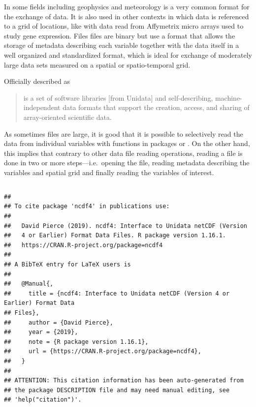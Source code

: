 \documentclass[krantz2]{krantz}\usepackage{knitr}%
\begin{document}
In some fields including geophysics and meteorology  is a very common format for the exchange of data. It is also used in other contexts in which data is referenced to a grid of locations, like with data read from Affymetrix micro arrays used to study gene expression. Files  files are binary but use a format that allows the storage of metadata describing each variable together with the data itself in a well organized and standardized format, which is ideal for exchange of moderately large data sets measured on a spatial or spatio-temporal grid.

Officially described as
\begin{quote}
 is a set of software libraries [from Unidata] and self-describing, machine-independent data formats that support the creation, access, and sharing of array-oriented scientific data.
\end{quote}

As sometimes  files are large, it is good that it is possible to selectively read the data from individual variables with functions in packages  or . On the other hand, this implies that contrary to other data file reading operations, reading a  file is done in two or more steps---i.e.\ opening the file, reading metadata describing the variables and spatial grid and finally reading the variables of interest.

\subsection[ncdf4]{}

\begin{knitrout}\footnotesize
{}\color{fgcolor}\begin{kframe}
\begin{alltt}
\hlstd{(} \hlstd{=} \hlstd{)}
\end{alltt}
\begin{verbatim}
## 
## To cite package 'ncdf4' in publications use:
## 
##   David Pierce (2019). ncdf4: Interface to Unidata netCDF (Version
##   4 or Earlier) Format Data Files. R package version 1.16.1.
##   https://CRAN.R-project.org/package=ncdf4
## 
## A BibTeX entry for LaTeX users is
## 
##   @Manual{,
##     title = {ncdf4: Interface to Unidata netCDF (Version 4 or Earlier) Format Data
## Files},
##     author = {David Pierce},
##     year = {2019},
##     note = {R package version 1.16.1},
##     url = {https://CRAN.R-project.org/package=ncdf4},
##   }
## 
## ATTENTION: This citation information has been auto-generated from
## the package DESCRIPTION file and may need manual editing, see
## 'help("citation")'.
\end{verbatim}
\end{kframe}
\end{knitrout}
\end{document}
